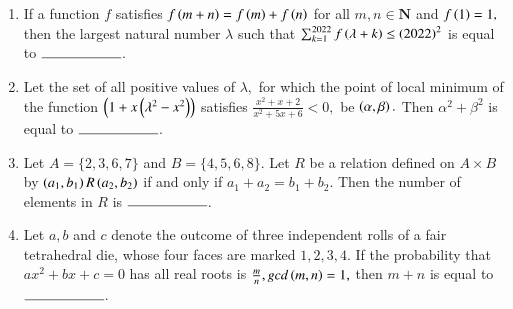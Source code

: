 \documentclass[journal,12pt,onecolumn]{IEEEtran}
\theoremstyle{remark}
\begin{document}
\begin{enumerate}
  \item If a function $f$ satisfies $f\left(m+n\right) = f\left(m\right) + f\left(n\right)$ for all $m,n \in \textbf{N}$ and $f\left(1\right) = 1,$ then the largest natural number $\lambda$ such that $\sum_{k=1}^{2022} f\left(\lambda + k\right) \le \left(2022\right) ^ 2$ is equal to $\rule{2cm}{0.15mm}$.\\

  \item Let the set of all positive values of $\lambda,$ for which the point of local minimum of the function $\left(1+x\left({\lambda} ^2 - x^2\right)\right)$ satisfies $\frac{x^2 + x+2}{x^2+5x+6} < 0,$ be $\left(\alpha, \beta\right).$ Then ${\alpha}^2 + {\beta}^2$ is equal to $\rule{2cm}{0.15mm}$.\\ 

  \item Let $A = \{2, 3, 6, 7\}$ and $B = \{4,5,6,8\}.$ Let $R$ be a relation defined on $A \times B$ by $\left(a_1,b_1\right) R \left(a_2,b_2\right)$ if and only if $a_1+a_2 = b_1 + b_2.$ Then the number of elements in $R$ is $\rule{2cm}{0.15mm}$.\\ 

  \item Let $a,b$ and $c$ denote the outcome of three independent rolls of a fair tetrahedral die, whose four faces are marked $1,2,3,4.$ If the probability that $ax^2 + bx +c=0$ has all real roots is $\frac{m}{n}, gcd\left(m,n\right)=1,$ then $m+n$ is equal to $\rule{2cm}{0.15mm}$.\\ 

  
\end{enumerate}
\end{document}
